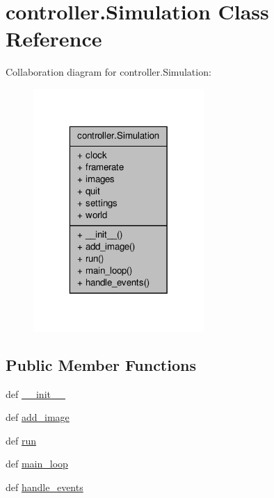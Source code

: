 \hypertarget{classcontroller_1_1Simulation}{\section{controller.\+Simulation Class Reference}
\label{classcontroller_1_1Simulation}
}


Collaboration diagram for controller.\+Simulation\+:\nopagebreak
\begin{figure}[H]
\begin{center}
\leavevmode
\includegraphics[width=184pt]{classcontroller_1_1Simulation__coll__graph}
\end{center}
\end{figure}
\subsection*{Public Member Functions}
\begin{DoxyCompactItemize}
\item 
def \hyperlink{classcontroller_1_1Simulation_a0d3a98e6f630a62f18aa5c0c35846381}{\+\_\+\+\_\+init\+\_\+\+\_\+}
\item 
def \hyperlink{classcontroller_1_1Simulation_a91674f018c921725aa36ec25396a7304}{add\+\_\+image}
\item 
def \hyperlink{classcontroller_1_1Simulation_a4cbf2928d3f930f4b8cad9c0e64c2524}{run}
\item 
def \hyperlink{classcontroller_1_1Simulation_ad86d932f45e2b80ec5336da7c6e6e085}{main\+\_\+loop}
\item 
def \hyperlink{classcontroller_1_1Simulation_ad3eb13a30931a88958e3c0c7b5b545a5}{handle\+\_\+events}
\end{DoxyCompactItemize}

